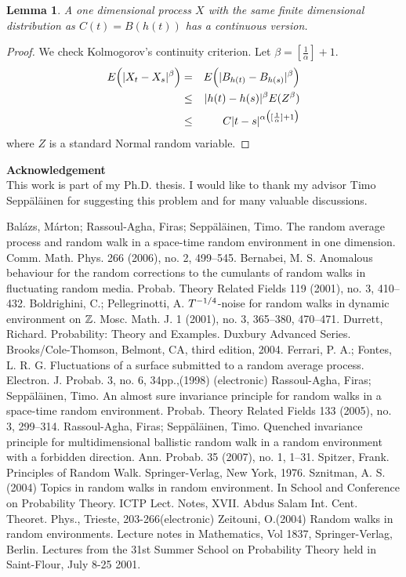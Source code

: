 \documentclass[11pt]{amsart}
\newtheorem{lemma}[theorem]{\sc Lemma}
\begin{document}
\begin{lemma}
 \label{ctsversion}
A one dimensional process $X$  with the same finite dimensional distribution as $C(t)=B(h(t))$ has a continuous version.
\end{lemma}
\begin{proof} We check Kolmogorov's continuity criterion. Let $\beta =[\frac{1}{\alpha}]+1$.
\begin{eqnarray*}
 E \Big{(}\vert X_t - X_s \vert^{\beta} \Big{)} &=& E \Big{(}\vert B_{h(t)} - B_{h(s)} \vert^{\beta} \Big{)} \\
&\leq& \vert h(t)- h(s) \vert^{\beta} E(Z^{\beta})\\
&\leq& C\vert t-s \vert ^{\alpha\big{(}[\frac{1}{\alpha}]+1\big{)}} 
\end{eqnarray*}
where $Z$ is a standard Normal random variable. 
\end{proof}
\vspace{0.4cm}
\textbf{Acknowledgement}\\
This work is part of my Ph.D. thesis. I would like to thank my advisor Timo Sepp\"al\"ainen for suggesting this problem and for many valuable discussions.

\begin{thebibliography}{99}
Bal\'azs, M\'arton; Rassoul-Agha, Firas; Sepp\"al\"ainen, Timo. The random average process and random walk in a space-time random environment in one dimension.  Comm. Math. Phys.  266  (2006),  no. 2, 499--545.
Bernabei, M. S. Anomalous behaviour for the random corrections to the cumulants of random walks in fluctuating random media.  Probab. Theory Related Fields  119  (2001),  no. 3, 410--432.
Boldrighini, C.; Pellegrinotti, A. $T\sp {-1/4}$-noise for random walks in dynamic environment on $\Bbb Z$.  Mosc. Math. J.  1  (2001),  no. 3, 365--380, 470--471.
 Durrett, Richard. Probability: Theory and Examples. Duxbury Advanced Series. Brooks/Cole-Thomson, Belmont, CA, third edition, 2004.
 Ferrari, P. A.; Fontes, L. R. G.  Fluctuations of a surface submitted to a random average process. Electron. J. Probab. 3, no. 6, 34pp.,(1998) (electronic)
Rassoul-Agha, Firas; Sepp\"al\"ainen, Timo. An almost sure invariance principle for random walks in a space-time random environment.  Probab. Theory Related Fields  133  (2005),  no. 3, 299--314.
Rassoul-Agha, Firas; Sepp\"al\"ainen, Timo. Quenched invariance principle for multidimensional ballistic random walk in a random environment with a forbidden direction.  Ann. Probab.  35  (2007),  no. 1, 1--31.
 Spitzer, Frank. Principles of Random Walk. Springer-Verlag, New York, 1976.
Sznitman, A. S.(2004) Topics in random walks in random environment. In School and Conference on Probability Theory. ICTP Lect. Notes, XVII. Abdus Salam Int. Cent. Theoret. Phys., Trieste, 203-266(electronic)
Zeitouni, O.(2004) Random walks in random environments. Lecture notes in Mathematics, Vol 1837, Springer-Verlag, Berlin. Lectures from the 31st Summer School on Probability Theory held in Saint-Flour, July 8-25 2001.

\end{thebibliography}
\end{document}
